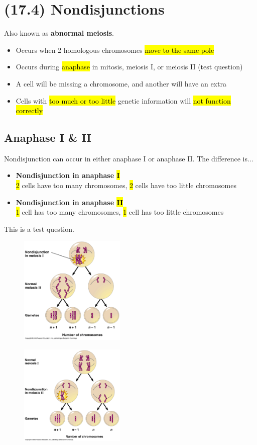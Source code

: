 \documentclass[a4paper,12pt]{article}
\begin{document}
\section{(17.4) Nondisjunctions}
Also known as \textbf{abnormal meiosis}.
\begin{itemize}
    \item{Occurs when 2 homologous chromosomes \hl{move to the same pole}}
    \item{Occurs during \hl{anaphase} in mitosis, meiosis I, or meiosis II (test question)}
    \item{A cell will be missing a chromosome, and another will have an extra}
    \item{Cells with \hl{too much or too little} genetic information will \hl{not function correctly}}
\end{itemize}

\subsection{Anaphase I \& II}
Nondisjunction can occur in either anaphase I or anaphase II. The difference is...
\begin{itemize}
    \item{\textbf{Nondisjunction in anaphase \hl{I}} \\ \hl{2} cells have too many chromosomes, \hl{2} cells have too little chromosomes}
    \item{\textbf{Nondisjunction in anaphase \hl{II}} \\ \hl{1} cell has too many chromosomes, \hl{1} cell has too little chromosomes}
\end{itemize}
This is a test question.

\begin{figure}[H]
    \centering
    \includegraphics[width=0.45\textwidth]{nonj1}
\end{figure}

\begin{figure}[H]
    \centering
    \includegraphics[width=0.45\textwidth]{nonj2}
\end{figure}
\end{document}
